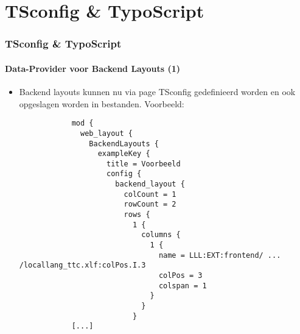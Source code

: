 %

\section{TSconfig \& TypoScript}

\begin{frame}[fragile]
	\frametitle{TSconfig \& TypoScript}
	\framesubtitle{Data-Provider voor Backend Layouts (1)}

	\lstset{basicstyle=\tiny\ttfamily}

	\begin{itemize}
		\item Backend layouts kunnen nu via page TSconfig gedefinieerd worden en ook opgeslagen worden in bestanden. Voorbeeld:

		\begin{lstlisting}
			mod {
			  web_layout {
			    BackendLayouts {
			      exampleKey {
			        title = Voorbeeld
			        config {
			          backend_layout {
			            colCount = 1
			            rowCount = 2
			            rows {
			              1 {
			                columns {
			                  1 {
			                    name = LLL:EXT:frontend/ ... /locallang_ttc.xlf:colPos.I.3
			                    colPos = 3
			                    colspan = 1
			                  }
			                }
			              }
			[...]
		\end{lstlisting}

	\end{itemize}

\end{frame}

